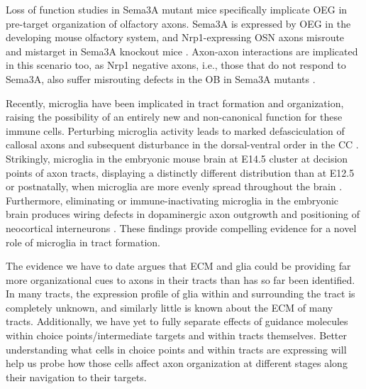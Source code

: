 Loss of function studies in Sema3A mutant mice specifically implicate OEG in pre-target organization of olfactory axons.
Sema3A is expressed by OEG in the developing mouse olfactory system, and Nrp1-expressing OSN axons misroute and mistarget in Sema3A knockout mice \cite{schwarting2000semaphorin}.
Axon-axon interactions are implicated in this scenario too, as Nrp1 negative axons, i.e., those that do not respond to Sema3A, also suffer misrouting defects in the OB in Sema3A mutants \cite{schwarting2000semaphorin}.

Recently, microglia have been implicated in tract formation and organization, raising the possibility of an entirely new and non-canonical function for these immune cells.
Perturbing microglia activity leads to marked defasciculation of callosal axons and subsequent disturbance in the dorsal-ventral order in the CC \cite{pont2014microglia}.
Strikingly, microglia in the embryonic mouse brain at E14.5 cluster at decision points of axon tracts, displaying a distinctly different distribution than at E12.5 or postnatally, when microglia are more evenly spread throughout the brain \cite{squarzoni2014microglia}.
Furthermore, eliminating or immune-inactivating microglia in the embryonic brain produces wiring defects in dopaminergic axon outgrowth and positioning of neocortical interneurons \cite{squarzoni2014microglia}.
These findings provide compelling evidence for a novel role of microglia in tract formation.

The evidence we have to date argues that ECM and glia could be providing far more organizational cues to axons in their tracts than has so far been identified.
In many tracts, the expression profile of glia within and surrounding the tract is completely unknown, and similarly little is known about the ECM of many tracts.
Additionally, we have yet to fully separate effects of guidance molecules within choice points/intermediate targets and within tracts themselves.
Better understanding what cells in choice points and within tracts are expressing will help us probe how those cells affect axon organization at different stages along their navigation to their targets.